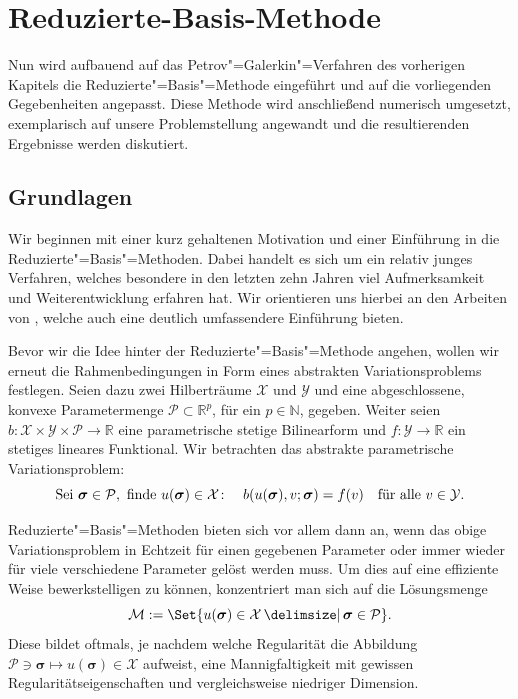 \documentclass[../main.tex]{subfiles}
\begin{document}
\chapter{Reduzierte-Basis-Methode} %
\label{chapter:rbm}

Nun wird aufbauend auf das Petrov"=Galerkin"=Verfahren des vorherigen Kapitels die Reduzierte"=Basis"=Methode eingeführt und auf die vorliegenden Gegebenheiten angepasst.
Diese Methode wird anschließend numerisch umgesetzt, exemplarisch auf unsere Problemstellung angewandt und die resultierenden Ergebnisse werden diskutiert.

\section{Grundlagen} %
\label{sub:grb:rb:grundlagen}

Wir beginnen mit einer kurz gehaltenen Motivation und einer Einführung in die Reduzierte"=Basis"=Methoden.
Dabei handelt es sich um ein relativ junges Verfahren, welches besondere in den letzten zehn Jahren viel Aufmerksamkeit und Weiterentwicklung erfahren hat.
Wir orientieren uns hierbei an den Arbeiten von \textcite{Rozza2008,Patera:2007un}, welche auch eine deutlich umfassendere Einführung bieten.

Bevor wir die Idee hinter der Reduzierte"=Basis"=Methode angehen, wollen wir erneut die Rahmenbedingungen in Form eines abstrakten Variationsproblems festlegen.
Seien dazu zwei Hilberträume $\mathcal X$ und $\mathcal Y$ und eine abgeschlossene, konvexe Parametermenge $\mathcal P \subset \mathbb{R}^{p}$, für ein $p \in \mathbb{N}$, gegeben.
Weiter seien $b \colon \mathcal X \times \mathcal Y \times \mathcal P \to \mathbb{R}$ eine parametrische stetige Bilinearform und $f \colon \mathcal Y \to \mathbb{R}$ ein stetiges lineares Funktional.
Wir betrachten das abstrakte parametrische Variationsproblem:
\begin{equation}
\label{eq:abstraktes_parametrische_vp}
    \text{Sei } \bm \sigma \in \mathcal P, \text{ finde } u(\bm \sigma) \in \mathcal X \colon \quad b(u(\bm \sigma), v; \bm \sigma) = f(v) \quad \fa v \in \mathcal Y.
\end{equation}

Reduzierte"=Basis"=Methoden bieten sich vor allem dann an, wenn das obige Variationsproblem in Echtzeit für einen gegebenen Parameter oder immer wieder für viele verschiedene Parameter gelöst werden muss.
Um dies auf eine effiziente Weise bewerkstelligen zu können, konzentriert man sich auf die Lösungsmenge
\begin{equation}
\label{eq:stetige_loesungsmenge}
    \mathcal M := \Set{u(\bm \sigma) \in \mathcal X \given \bm \sigma \in \mathcal P}.
\end{equation}
Diese bildet oftmals, je nachdem welche Regularität die Abbildung $\mathcal P \ni \bm \sigma \mapsto u(\bm \sigma) \in \mathcal X$ aufweist, eine Mannigfaltigkeit mit gewissen Regularitätseigenschaften und vergleichsweise niedriger Dimension.
\end{document}
